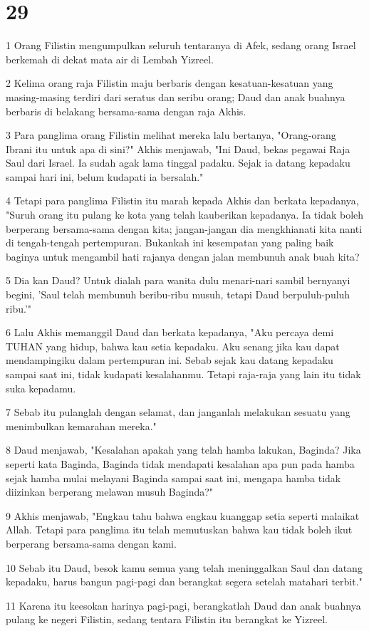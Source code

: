 \chapter{29}

\par 1 Orang Filistin mengumpulkan seluruh tentaranya di Afek, sedang orang Israel berkemah di dekat mata air di Lembah Yizreel.
\par 2 Kelima orang raja Filistin maju berbaris dengan kesatuan-kesatuan yang masing-masing terdiri dari seratus dan seribu orang; Daud dan anak buahnya berbaris di belakang bersama-sama dengan raja Akhis.
\par 3 Para panglima orang Filistin melihat mereka lalu bertanya, "Orang-orang Ibrani itu untuk apa di sini?" Akhis menjawab, "Ini Daud, bekas pegawai Raja Saul dari Israel. Ia sudah agak lama tinggal padaku. Sejak ia datang kepadaku sampai hari ini, belum kudapati ia bersalah."
\par 4 Tetapi para panglima Filistin itu marah kepada Akhis dan berkata kepadanya, "Suruh orang itu pulang ke kota yang telah kauberikan kepadanya. Ia tidak boleh berperang bersama-sama dengan kita; jangan-jangan dia mengkhianati kita nanti di tengah-tengah pertempuran. Bukankah ini kesempatan yang paling baik baginya untuk mengambil hati rajanya dengan jalan membunuh anak buah kita?
\par 5 Dia kan Daud? Untuk dialah para wanita dulu menari-nari sambil bernyanyi begini, 'Saul telah membunuh beribu-ribu musuh, tetapi Daud berpuluh-puluh ribu.'"
\par 6 Lalu Akhis memanggil Daud dan berkata kepadanya, "Aku percaya demi TUHAN yang hidup, bahwa kau setia kepadaku. Aku senang jika kau dapat mendampingiku dalam pertempuran ini. Sebab sejak kau datang kepadaku sampai saat ini, tidak kudapati kesalahanmu. Tetapi raja-raja yang lain itu tidak suka kepadamu.
\par 7 Sebab itu pulanglah dengan selamat, dan janganlah melakukan sesuatu yang menimbulkan kemarahan mereka."
\par 8 Daud menjawab, "Kesalahan apakah yang telah hamba lakukan, Baginda? Jika seperti kata Baginda, Baginda tidak mendapati kesalahan apa pun pada hamba sejak hamba mulai melayani Baginda sampai saat ini, mengapa hamba tidak diizinkan berperang melawan musuh Baginda?"
\par 9 Akhis menjawab, "Engkau tahu bahwa engkau kuanggap setia seperti malaikat Allah. Tetapi para panglima itu telah memutuskan bahwa kau tidak boleh ikut berperang bersama-sama dengan kami.
\par 10 Sebab itu Daud, besok kamu semua yang telah meninggalkan Saul dan datang kepadaku, harus bangun pagi-pagi dan berangkat segera setelah matahari terbit."
\par 11 Karena itu keesokan harinya pagi-pagi, berangkatlah Daud dan anak buahnya pulang ke negeri Filistin, sedang tentara Filistin itu berangkat ke Yizreel.

